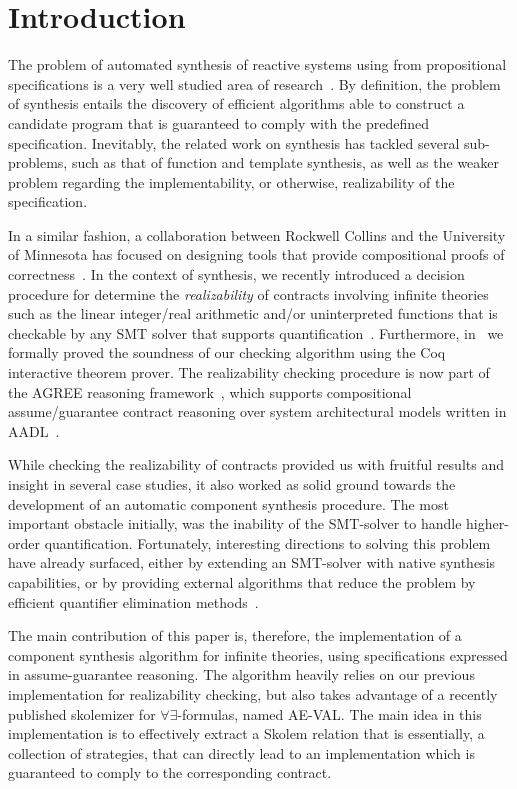 \section{Introduction}
The problem of automated synthesis of reactive systems using from propositional specifications is a very well studied area of research~\cite{gulwani2010dimensions}. By definition, the problem of synthesis entails the discovery of efficient algorithms able to construct a candidate program that is guaranteed to comply with the predefined specification. Inevitably, the related work on synthesis has tackled several sub-problems, such as that of function and template synthesis, as well as the weaker problem regarding the implementability, or otherwise, realizability of the specification.

In a similar fashion, a collaboration between Rockwell Collins and
the University of Minnesota has focused on designing tools that provide
compositional proofs of correctness~\cite{NFM2012:CoGaMiWhLaLu,Whalen13:WhatHow:TwinPeaksIEEESoftware,hilt2013,QFCS15:backes}.
In the context of synthesis, we recently introduced a decision procedure for determine the {\em realizability} of contracts involving infinite theories such as the linear integer/real arithmetic and/or uninterpreted functions that is checkable by any SMT solver that supports quantification~\cite{Katis15:Realizability}. Furthermore, in~\cite{Katis:machine} we formally proved the soundness of our checking algorithm using the Coq interactive theorem prover. The realizability checking procedure is now part of the AGREE reasoning framework~\cite{NFM2012:CoGaMiWhLaLu}, which supports compositional
assume/guarantee contract reasoning over system architectural models written in
AADL~\cite{SAE:AADL}.

While checking the realizability of contracts provided us with fruitful results
and insight in several case studies, it also worked as solid ground towards the
development of an automatic component synthesis procedure. The
most important obstacle initially, was the inability of the SMT-solver to
handle higher-order quantification. Fortunately, interesting directions to
solving this problem have already surfaced, either by extending an SMT-solver
with native synthesis capabilities\cite{reynoldscounterexample}, or by providing
external algorithms that reduce the problem by efficient quantifier elimination methods~\cite{fedyukovichae}.

The main contribution of this paper is, therefore, the implementation of a
component synthesis algorithm for infinite theories, using specifications
expressed in assume-guarantee reasoning.  The algorithm heavily relies on our previous implementation for realizability checking, but also takes advantage of a recently published skolemizer for $\forall\exists$-formulas, named
AE-VAL. The main idea in this implementation is to effectively extract a Skolem
relation that is essentially, a collection of strategies, that can directly lead to an implementation which is guaranteed to comply to the corresponding contract.

